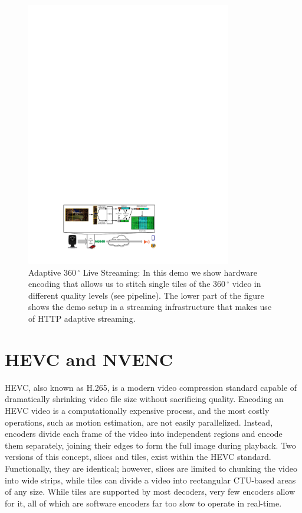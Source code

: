 \renewcommand{\figurename}{Fig.}
\begin{figure}[t]
	\centering
	\includegraphics[width=0.8\textwidth]{figures/Streaming_scenario_v3.pdf}
	\caption{Adaptive $360\,^{\circ}$ Live Streaming: In this demo we show hardware encoding that allows us to stitch single tiles of the $360\,^{\circ}$ video in different quality levels (see pipeline). The lower part of the figure shows the demo setup in a streaming infrastructure that makes use of HTTP adaptive streaming.}
	\label{fig:pipeline}
\end{figure}

\section{HEVC and NVENC} \label{hevc}

HEVC, also known as H.265, is a modern video compression standard capable of dramatically shrinking video file size without sacrificing quality. Encoding an HEVC video is a computationally expensive process, and the most costly operations, such as motion estimation, are not easily parallelized. Instead, encoders divide each frame of the video into independent regions and encode them separately, joining their edges to form the full image during playback. Two versions of this concept, slices and tiles, exist within the HEVC standard. Functionally, they are identical; however, slices are limited to chunking the video into wide strips, while tiles can divide a video into rectangular CTU-based areas of any size. While tiles are supported by most decoders, very few encoders allow for it, all of which are software encoders far too slow to operate in real-time.

